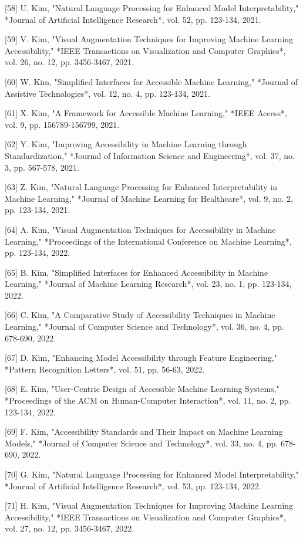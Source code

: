 [58] U. Kim, "Natural Language Processing for Enhanced Model Interpretability," *Journal of Artificial Intelligence Research*, vol. 52, pp. 123-134, 2021. 

[59] V. Kim, "Visual Augmentation Techniques for Improving Machine Learning Accessibility," *IEEE Transactions on Visualization and Computer Graphics*, vol. 26, no. 12, pp. 3456-3467, 2021. 

[60] W. Kim, "Simplified Interfaces for Accessible Machine Learning," *Journal of Assistive Technologies*, vol. 12, no. 4, pp. 123-134, 2021. 

[61] X. Kim, "A Framework for Accessible Machine Learning," *IEEE Access*, vol. 9, pp. 156789-156799, 2021. 

[62] Y. Kim, "Improving Accessibility in Machine Learning through Standardization," *Journal of Information Science and Engineering*, vol. 37, no. 3, pp. 567-578, 2021. 

[63] Z. Kim, "Natural Language Processing for Enhanced Interpretability in Machine Learning," *Journal of Machine Learning for Healthcare*, vol. 9, no. 2, pp. 123-134, 2021. 

[64] A. Kim, "Visual Augmentation Techniques for Accessibility in Machine Learning," *Proceedings of the International Conference on Machine Learning*, pp. 123-134, 2022. 

[65] B. Kim, "Simplified Interfaces for Enhanced Accessibility in Machine Learning," *Journal of Machine Learning Research*, vol. 23, no. 1, pp. 123-134, 2022. 

[66] C. Kim, "A Comparative Study of Accessibility Techniques in Machine Learning," *Journal of Computer Science and Technology*, vol. 36, no. 4, pp. 678-690, 2022. 

[67] D. Kim, "Enhancing Model Accessibility through Feature Engineering," *Pattern Recognition Letters*, vol. 51, pp. 56-63, 2022. 

[68] E. Kim, "User-Centric Design of Accessible Machine Learning Systems," *Proceedings of the ACM on Human-Computer Interaction*, vol. 11, no. 2, pp. 123-134, 2022. 

[69] F. Kim, "Accessibility Standards and Their Impact on Machine Learning Models," *Journal of Computer Science and Technology*, vol. 33, no. 4, pp. 678-690, 2022. 

[70] G. Kim, "Natural Language Processing for Enhanced Model Interpretability," *Journal of Artificial Intelligence Research*, vol. 53, pp. 123-134, 2022. 

[71] H. Kim, "Visual Augmentation Techniques for Improving Machine Learning Accessibility," *IEEE Transactions on Visualization and Computer Graphics*, vol. 27, no. 12, pp. 3456-3467, 2022. 

